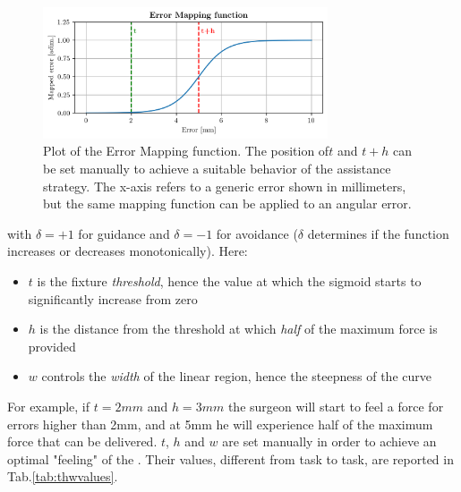 \documentclass[../main.tex]{subfiles}
\begin{document}
\begin{figure}[h!]
    \centering
        \includegraphics[width=0.75\textwidth]{images/mappingfunction.png}
        \caption{Plot of the Error Mapping function. The position of$t$ and $t+h$ can be set manually to achieve a suitable behavior of the assistance strategy. The x-axis refers to a generic error shown in millimeters, but the same mapping function can be applied to an angular error.} 
        \label{fig:mappingfunctiion}
  \end{figure}

with $\delta = +1$ for guidance \vfs and $\delta = -1$ for avoidance \vfs ($\delta$ determines if the function increases or decreases monotonically). Here:
\begin{itemize}
  \item $t$ is the fixture \textit{threshold}, hence the value at which the sigmoid starts to significantly increase from zero
  \item $h$ is the distance from the threshold at which \textit{half} of the maximum force is provided
  \item $w$ controls the \textit{width} of the linear region, hence the steepness of the curve 
\end{itemize}
For example, if $t=2\si{mm}$ and $h=3\si{mm}$ the surgeon will start to feel a force for errors higher than 2\si{mm}, and at 5\si{mm} he will experience half of the maximum force that can be delivered.
$t$, $h$ and $w$ are set manually in order to achieve an optimal "feeling" of the \vf. Their values, different from task to task, are reported in Tab.\ref{tab:thwvalues}.
\end{document}

